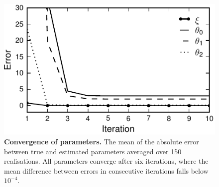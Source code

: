 \documentclass[12pt]{iopart}
\begin{document}
\begin{figure}[!ht]
\begin{center}
\includegraphics{./Graph/pdf/Figure6.pdf}
\end{center}
\caption{{\bf Convergence of parameters.} The mean of the absolute error between true and estimated parameters averaged over 150 realisations. All parameters converge after six iterations, where the mean difference between errors in consecutive iterations falls below $10^{-4}$.}
\label{fig:Figure6}
\end{figure}
\end{document}

